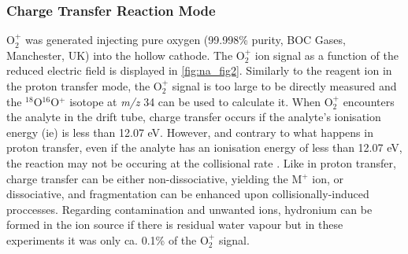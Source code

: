 \subsubsection{Charge Transfer Reaction Mode}
O$_2^+$ was generated injecting pure oxygen (99.998\% purity, BOC Gases, Manchester, UK) into the hollow cathode.  
The O$_2^+$ ion signal as a function of the reduced electric field is displayed in \autoref{fig:na_fig2}.    
Similarly to the reagent ion in the proton transfer mode, the O$_2^+$ signal is too large to be directly measured and the $^{18}$O$^{16}$O$^+$ isotope at \textit{m/z} 34 can be used to calculate it.
When O$_2^+$ encounters the analyte in the drift tube, charge transfer occurs if the analyte's ionisation energy (\acrshort{ie}) is less than 12.07 eV.
However, and contrary to what happens in proton transfer, even if the analyte has an ionisation energy of less than 12.07 eV, the reaction may not be occuring at the collisional rate  \cite{jarvis2000charge}. 
Like in proton transfer, charge transfer can be either non-dissociative, yielding the M$^+$ ion, or dissociative, and fragmentation can be enhanced upon collisionally-induced proccesses. 
Regarding contamination and unwanted ions, hydronium can be formed in the ion source if there is residual water vapour but in these experiments it was only ca. 0.1\% of the O$_2^+$ signal.


